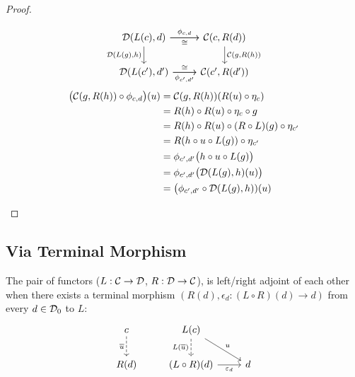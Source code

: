 \begin{theorem}
\begin{proof}
\begin{description}
        \[\begin{tikzcd}[ampersand replacement=\&]
          {\mathcal{D}(L(c), d)} \& {\mathcal{C}(c, R(d))} \\
          {\mathcal{D}(L(c'), d')} \& {\mathcal{C}(c', R(d'))}
          \arrow["{\phi_{c,d}}", from=1-1, to=1-2]
          \arrow["{\mathcal{D}(L(g),h)}"', from=1-1, to=2-1]
          \arrow["{\phi_{c',d'}}"', from=2-1, to=2-2]
          \arrow["{\mathcal{C}(g,R(h))}", from=1-2, to=2-2]
          \arrow["\cong"', from=1-1, to=1-2]
          \arrow["\cong", from=2-1, to=2-2]
        \end{tikzcd}\]
        \[
          \begin{aligned}
            \big(\mathcal{C}(g, R(h))\circ \phi_{c,d}\big)(u)
            &= \mathcal{C}(g, R(h))(R(u)\circ\eta_c)\\
            &= R(h)\circ R(u)\circ\eta_c \circ g\\
            &= R(h)\circ R(u) \circ (R\circ L)(g)\circ \eta_{c'}\\
            &= R(h\circ u\circ L(g))\circ \eta_{c'}\\
            &= \phi_{c', d'}\big(h\circ u \circ L(g)\big)\\
            &= \phi_{c', d'}\big(\mathcal{D}(L(g), h)(u)\big)\\
            &= \big(\phi_{c', d'}\circ \mathcal{D}(L(g), h))(u)
          \end{aligned}
        \]
    \end{description}
  \end{proof}
\end{theorem}

\subsection{Via Terminal Morphism}

\begin{definition}
  The pair of functors ($L: \mathcal{C}\to \mathcal{D}$, $R: \mathcal{D}\to \mathcal{C}$), is left/right adjoint of
  each other when there exists a terminal morphism $(R(d), \epsilon_d: (L\circ
  R)(d) \to d)$ from every $d\in \mathcal{D}_0$ to $L$:
  \parencite{awodey:category_theory}
  \[\begin{tikzcd}[ampersand replacement=\&]
    c \& {L(c)} \\
    {R(d)} \& {(L\circ R)(d)} \& d
    \arrow["{\overline{u}}"', dashed, from=1-1, to=2-1]
    \arrow["{L(\overline{u})}"', dashed, from=1-2, to=2-2]
    \arrow["{\varepsilon_d}"', from=2-2, to=2-3]
    \arrow["u", from=1-2, to=2-3]
  \end{tikzcd}\]
\end{definition}

